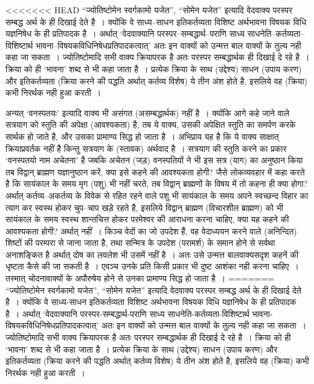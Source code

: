 <<<<<<< HEAD
“ज्योतिष्टोमेन स्वर्गकामो यजेत”, “सोमेन यजेत” इत्यादि वेदवाक्य परस्पर सम्बद्ध अर्थ के ही दिखाई देते है~। क्योंकि वे साध्य–साधन इतिकर्तव्यता विशिष्ट अर्थभावना विषयक विधि यज्ञनिषेध के ही प्रतिपादक है~। अर्थात् ‘वेदवाक्यानि परस्पर–सम्बद्धार्थ–पराणि साध्य साधनेति–कर्तव्यता–विशिष्टार्थ भावना–विषयकविधिनिषेधप्रतिपादकत्वात्' अतः इन वाक्यों को उन्मत्त बाल वाक्यों के तुल्य नही कहा जा सकता~। ज्योतिष्टोमादि सभी वाक्य क्रियापरक है अतः परस्पर सम्बद्धार्थक ही दिखाई दे रहे है~। क्रिया को ही ‘भावना' शब्द से भी कहा जाता है~। प्रत्येक क्रिया के साथ (उद्देश्य) साधन (उपाय करण) और इतिकर्तव्यता (क्रिया करने की पद्धति अर्थात् कर्तव्य विशेष) ये तीन अंश होते है, इसलिये वह (क्रिया) कभी निरर्थक नही हुआ करती~।

अन्यत् ‘वनस्पतयः' इत्यादि वाक्य भी असंगत (असम्बद्धार्थक) नहीं है~। क्योंकि आगे कहे जाने वाले सत्रयाग को स्तुति की अपेक्षा (आवश्यकता) है, तब ये वाक्य, उसकी अपेक्षित स्तुति का समर्पण करके सार्थक हो जाते है, और उसका प्रामाण्य सिद्ध हो जाता है~। अभिप्राय यह है कि ये वाक्य साक्षात् क्रियाप्रवर्तक नहीं है किन्तु सत्रयाग के (स्तावक) अर्थवाद है~। सत्रयाग की स्तुति करने का प्रकार ‘वनस्पतयो नाम अचेतना' है जबकि अचेतन (जड़) वनस्पतियों ने भी इस सत्र (याग) का अनुष्ठान किया तब विद्वान् ब्राह्मण यज्ञानुष्ठान करें, क्या इसे कहने की आवश्यकता होगी? जैसे लोकव्यवहार में कहा करते है कि सायंकाल के समय मृग (पशु) भी नहीं चरते, तब विद्वान् ब्राह्मणों के विषय में तो कहना ही क्या होगा? अर्थात् कर्तव्य–अकर्तव्य के विवेक से रहित रहने वाले पशु भी सायंकाल के समय अपने स्वच्छन्द विहार का त्याग कर स्वस्थ होकर चुप–चाप खड़े रहते है, इसलिये विद्वान् ब्राह्मण (विचारशील ब्राह्मण) को भी सायंकाल के समय स्वस्थ शान्तचित्त होकर परमेश्वर की आराधना करना चाहिए, क्या यह कहने की आवश्यकता होगी? अर्थात् नहीं~। किञ्च वेदों का जो उपदेश हैं, वह वेदाध्ययन करने वाले (अनिन्दित) शिष्टों की परम्परा से जाना जाता है, तथा सन्मित्र के उपदेश (परामर्श) के समान होने से सर्वथा अनाशङ्कित है अर्थात् दोष का लवलेश भी उसमें नहीं है~। अतः उसे उन्मत्त बालवाक्यसदृश कहनें की धृष्टता कैसे की जा सकती है~। एवञ्च उनके प्रति किसी प्रकार भी दुष्ट आशंका नही करना चाहिए~। तस्मात् चोदनावाक्यों के अपौरुषेय होने से उनका प्रामाण्य सिद्ध हो जाता है~।
=======
“ज्योतिष्टोमेन स्वर्गकामो यजेत”, “सोमेन यजेत” इत्यादि वेदवाक्य परस्पर सम्बद्ध अर्थ के ही दिखाई देते है~। क्योंकि वे साध्य-साधन इतिकर्तव्यता विशिष्ट अर्थभावना विषयक विधि यज्ञनिषेध के ही प्रतिपादक है~। अर्थात् ‘वेदवाक्यानि परस्पर-सम्बद्धार्थ-पराणि साध्य साधनेति-कर्तव्यता-विशिष्टार्थ भावना-विषयकविधिनिषेधप्रतिपादकत्वात्' अतः इन वाक्यों को उन्मत्त बाल वाक्यों के तुल्य नही कहा जा सकता~। ज्योतिष्टोमादि सभी वाक्य क्रियापरक है अतः परस्पर सम्बद्धार्थक ही दिखाई दे रहे है~। क्रिया को ही ‘भावना' शब्द से भी कहा जाता है~। प्रत्येक क्रिया के साथ (उद्देश्य) साधन (उपाय करण) और इतिकर्तव्यता (क्रिया करने की पद्धति अर्थात् कर्तव्य विशेष) ये तीन अंश होते है, इसलिये वह (क्रिया) कभी निरर्थक नही हुआ करती~।

